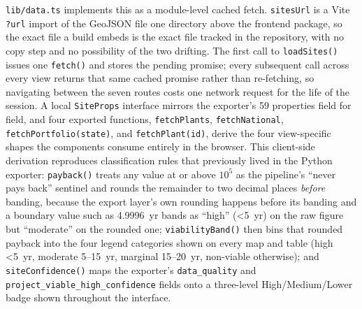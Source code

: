\documentclass[12pt,letterpaper]{report}
\begin{document}
\texttt{lib/data.ts} implements this as a module-level cached fetch.
\texttt{sitesUrl} is a Vite \texttt{?url} import of the GeoJSON file one
directory above the frontend package, so the exact file a build embeds is
the exact file tracked in the repository, with no copy step and no
possibility of the two drifting. The first call to \texttt{loadSites()}
issues one \texttt{fetch()} and stores the pending promise; every
subsequent call across every view returns that same cached promise rather
than re-fetching, so navigating between the seven routes costs one network
request for the life of the session. A local \texttt{SiteProps} interface
mirrors the exporter's 59 properties field for field, and four exported
functions, \texttt{fetchPlants}, \texttt{fetchNational},
\texttt{fetchPortfolio(state)}, and \texttt{fetchPlant(id)}, derive the four
view-specific shapes the components consume entirely in the browser. This
client-side derivation reproduces classification rules that previously
lived in the Python exporter: \texttt{payback()} treats any value at or
above $10^5$ as the pipeline's ``never pays back'' sentinel and rounds the
remainder to two decimal places \emph{before} banding, because the export
layer's own rounding happens before its banding and a boundary value such
as 4.9996~yr bands as ``high'' (\textless 5~yr) on the raw figure but
``moderate'' on the rounded one; \texttt{viabilityBand()} then bins that
rounded payback into the four legend categories shown on every map and
table (high \textless 5~yr, moderate 5--15~yr, marginal 15--20~yr,
non-viable otherwise); and \texttt{siteConfidence()} maps the exporter's
\texttt{data\_quality} and \texttt{project\_viable\_high\_confidence}
fields onto a three-level High/Medium/Lower badge shown throughout the
interface.
\end{document}
